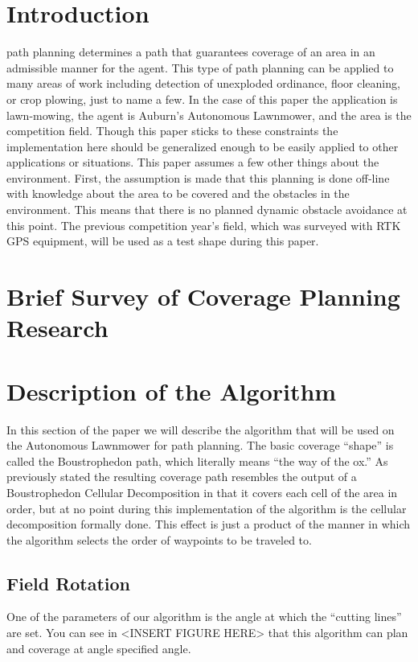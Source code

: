 \documentclass[journal]{IEEEtran}
\begin{document}
  \section{Introduction}
   path planning determines a path that guarantees coverage of an area in an admissible manner for the agent.  This type of path planning can be applied to many areas of work including detection of unexploded ordinance, floor cleaning, or crop plowing, just to name a few. In the case of this paper the application is lawn-mowing, the agent is Auburn's Autonomous Lawnmower, and the area is the competition field.  Though this paper sticks to these constraints the implementation here should be generalized enough to be easily applied to other applications or situations.  This paper assumes a few other things about the environment.  First, the assumption is made that this planning is done off-line with knowledge about the area to be covered and the obstacles in the environment.  This means that there is no planned dynamic obstacle avoidance at this point.  The previous competition year's field, which was surveyed with RTK GPS equipment, will be used as a test shape during this paper.
  
  \section{Brief Survey of Coverage Planning Research}
  
  \section{Description of the Algorithm}
  In this section of the paper we will describe the algorithm that will be used on the Autonomous Lawnmower for path planning.  The basic coverage ``shape'' is called the Boustrophedon path, which literally means ``the way of the ox.''\cite{Choset_1997_1416}  As previously stated the resulting coverage path resembles the output of a Boustrophedon Cellular Decomposition in that it covers each cell of the area in order, but at no point during this implementation of the algorithm is the cellular decomposition formally done.  This effect is just a product of the manner in which the algorithm selects the order of waypoints to be traveled to.
  
  \subsection{Field Rotation}
  One of the parameters of our algorithm is the angle at which the ``cutting lines'' are set.  You can see in <INSERT FIGURE HERE> that this algorithm can plan and coverage at angle specified angle.
  
\end{document}
